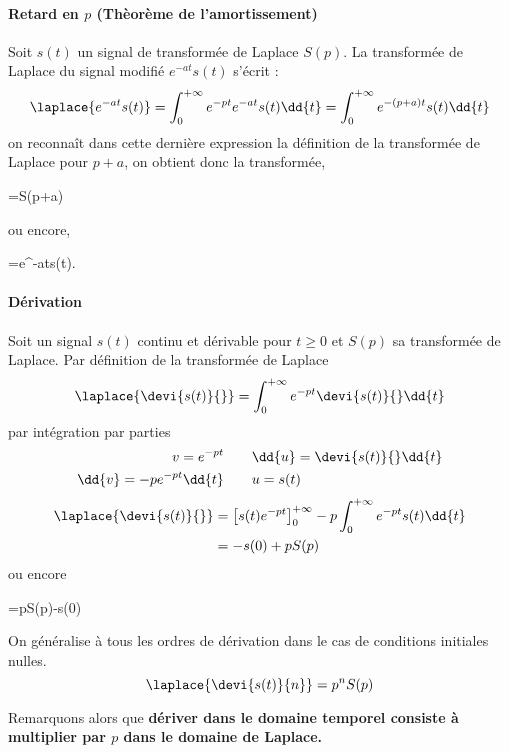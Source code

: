 \paragraph{Retard en $p$ (Thèorème de l'amortissement)}
Soit $s(t)$ un signal de transformée de Laplace $S(p)$. La transformée 
de Laplace du signal modifié $e^{-at}s(t)$ s'écrit :
$$
\laplace{e^{-at}s(t)}
=\int_{0}^{+\infty} e^{-pt}e^{-at}s(t)\dd{t}
=\int_{0}^{+\infty} e^{-(p+a)t}s(t)\dd{t}
$$
on reconnaît dans cette dernière expression la définition de la transformée 
de Laplace pour $p+a$, on obtient donc la transformée, 
\begin{bequation}
    =S(p+a)
\end{bequation}
ou encore,
\begin{bequation}
    =e^{-at}s(t).
\end{bequation}

\paragraph{Dérivation}
Soit un signal $s(t)$ continu et dérivable pour $t\ge0$ et $S(p)$ 
sa transformée de Laplace. Par définition de la transformée de Laplace 
$$
\laplace{\devi{s(t)}{}}=\int_{0}^{+\infty} e^{-pt}\devi{s(t)}{}\dd{t}
$$
par intégration par parties
\begin{align*}
    v=e^{-pt}\qquad&\dd{u}=\devi{s(t)}{}\dd{t}\\
    \dd{v}=-pe^{-pt}\dd{t}\qquad&u=s(t)
\end{align*}
\begin{align*}
\laplace{\devi{s(t)}{}}&=\left[s(t)e^{-pt}\right]_0
                         ^{+\infty}-p\int_{0}^{+\infty}e^{-pt}s(t)\dd{t}\\
                       &=-s(0)+pS(p)
\end{align*}
ou encore
\begin{bequation}
    =pS(p)-s(0)
\end{bequation}
On généralise à tous les ordres de dérivation dans le cas de conditions 
initiales nulles.
$$
\laplace{\devi{s(t)}{n}}=p^nS(p)
$$

Remarquons alors que \textbf{dériver dans le domaine temporel consiste 
à multiplier par $p$ dans le domaine de Laplace.}
